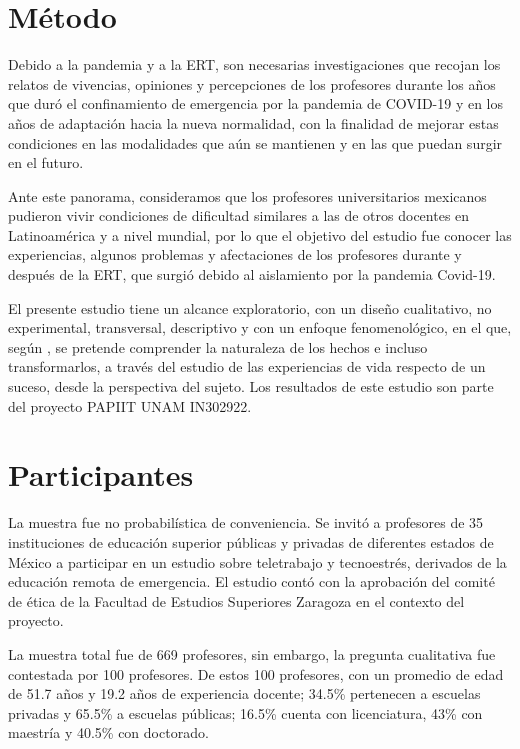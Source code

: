 \documentclass[spanish]{textolivre}
\begin{document}
\section{Método}


Debido a la pandemia y a la ERT, son necesarias investigaciones que recojan los relatos de vivencias, opiniones y percepciones de los profesores durante los años que duró el confinamiento de emergencia por la pandemia de COVID-19 y en los años de adaptación hacia la nueva normalidad, con la finalidad de mejorar estas condiciones en las modalidades que aún se mantienen y en las que puedan surgir en el futuro.

Ante este panorama, consideramos que los profesores universitarios mexicanos pudieron vivir condiciones de dificultad similares a las de otros docentes en Latinoamérica y a nivel mundial, por lo que el objetivo del estudio fue conocer las experiencias, algunos problemas y afectaciones de los profesores durante y después de la ERT, que surgió debido al aislamiento por la pandemia Covid-19.

El presente estudio tiene un alcance exploratorio, con un diseño cualitativo, no experimental, transversal, descriptivo y con un enfoque fenomenológico, en el que, según \textcite{fuster_guillen_investigacion_2019}, se pretende comprender la naturaleza de los hechos e incluso transformarlos, a través del estudio de las experiencias de vida respecto de un suceso, desde la perspectiva del sujeto. Los resultados de este estudio son parte del proyecto PAPIIT UNAM IN302922.

\section{Participantes}

La muestra fue no probabilística de conveniencia. Se invitó a profesores de 35 instituciones de educación superior públicas y privadas de diferentes estados de México a participar en un estudio sobre teletrabajo y tecnoestrés, derivados de la educación remota de emergencia. El estudio contó con la aprobación del comité de ética de la Facultad de Estudios Superiores Zaragoza en el contexto del proyecto.

La muestra total fue de 669 profesores, sin embargo, la pregunta cualitativa fue contestada por 100 profesores. De estos 100 profesores, con un promedio de edad de 51.7 años y 19.2 años de experiencia docente; 34.5\% pertenecen a escuelas privadas y 65.5\% a escuelas públicas; 16.5\% cuenta con licenciatura, 43\% con maestría y 40.5\% con doctorado.
\end{document}
